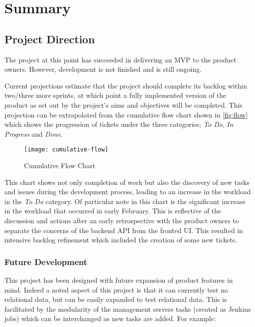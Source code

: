 \section{Summary}

  \subsection{Project Direction}
  
  The project at this point has succeeded in delivering an MVP to the product owners. However, development is not finished and is still ongoing.
  
  Current projections estimate that the project should complete its backlog within two/three more sprints, at which point a fully implemented version of the product as set out by the project's aims and objectives will be completed. This projection can be extrapolated from the cumulative flow chart shown in \autoref{fig:flow} which shows the progression of tickets under the three categories; \textit{To Do}, \textit{In Progress} and \textit{Done}.
  
  \begin{figure}[H]
    \setlength{\belowcaptionskip}{15pt plus 3pt minus 2pt}
    \caption{Cumulative Flow Chart}
    \centering
    \texttt{[image: cumulative-flow]}
    \label{fig:flow}
  \end{figure}
  
  This chart shows not only completion of work but also the discovery of new tasks and issues during the development  process, leading to an increase in the workload in the \textit{To Do} category. Of particular note in this chart is the significant increase in the workload that occurred in early February. This is reflective of the discussion and actions after an early retrospective with the product owners to separate the concerns of the backend API from the fronted UI. This resulted in intensive backlog refinement which included the creation of some new tickets.
  
  \subsubsection{Future Development}
  This project has been designed with future expansion of product features in mind. Indeed a noted aspect of this project is that it can currently test no relational data, but can be easily expanded to test relational data. This is facilitated by the modularity of the management servers tasks (created as Jenkins jobs) which can be interchanged as new tasks are added. For example:
  
